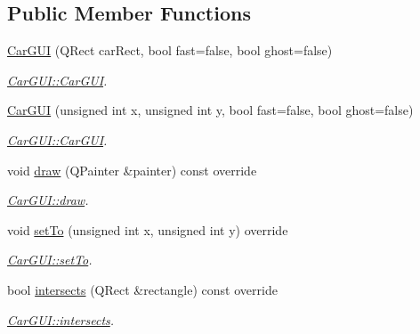 \subsection*{Public Member Functions}
\begin{DoxyCompactItemize}
\item 
\hyperlink{classCarGUI_a3246f25cec9681b6719f41da2abaa21a}{Car\-G\-U\-I} (Q\-Rect car\-Rect, bool fast=false, bool ghost=false)
\begin{DoxyCompactList}\small\item\em \hyperlink{classCarGUI_a3246f25cec9681b6719f41da2abaa21a}{Car\-G\-U\-I\-::\-Car\-G\-U\-I}. \end{DoxyCompactList}\item 
\hyperlink{classCarGUI_a5b55f4b51094ca51114bd9e4f81b3981}{Car\-G\-U\-I} (unsigned int x, unsigned int y, bool fast=false, bool ghost=false)
\begin{DoxyCompactList}\small\item\em \hyperlink{classCarGUI_a3246f25cec9681b6719f41da2abaa21a}{Car\-G\-U\-I\-::\-Car\-G\-U\-I}. \end{DoxyCompactList}\item 
void \hyperlink{classCarGUI_afb151452fd5ab5723fbadc18b292b1cd}{draw} (Q\-Painter \&painter) const override
\begin{DoxyCompactList}\small\item\em \hyperlink{classCarGUI_afb151452fd5ab5723fbadc18b292b1cd}{Car\-G\-U\-I\-::draw}. \end{DoxyCompactList}\item 
void \hyperlink{classCarGUI_a9492214aed3b7bcdd9ac02a9d05c62c5}{set\-To} (unsigned int x, unsigned int y) override
\begin{DoxyCompactList}\small\item\em \hyperlink{classCarGUI_a9492214aed3b7bcdd9ac02a9d05c62c5}{Car\-G\-U\-I\-::set\-To}. \end{DoxyCompactList}\item 
bool \hyperlink{classCarGUI_ac10777d0be48432605fa02c7d1e70efc}{intersects} (Q\-Rect \&rectangle) const override
\begin{DoxyCompactList}\small\item\em \hyperlink{classCarGUI_ac10777d0be48432605fa02c7d1e70efc}{Car\-G\-U\-I\-::intersects}. \end{DoxyCompactList}\end{DoxyCompactItemize}
